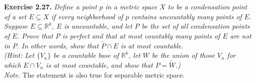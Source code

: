 \documentclass{article}
\begin{document}



\textbf{Exercise 2.27.}
\emph{
Define a point $p$ in a metric space $X$ to be a {\it condensation
point} of a set $E \subseteq X$ if every neighborhood of $p$ contains
uncountably many points of $E$.} \\

\emph{Suppose $E \subseteq \mathbb{R}^k$, $E$ is uncountable,
and let $P$ be the set of all condensation points of $E$.
Prove that $P$ is perfect and that at most countably many points of $E$ are not in $P$.
In other words, show that $\widetilde{P} \cap E$ is at most countable.} \\

\emph{(Hint: Let $\{V_n\}$ be a countable base of $\mathbb{R}^k$,
let $W$ be the union of those $V_n$ for which $E \cap V_n$ is at most countable,
and show that $P = \widetilde{W}$.)} \\

\emph{Note.}
The statement is also true for separable metric space. \\
\end{document}

